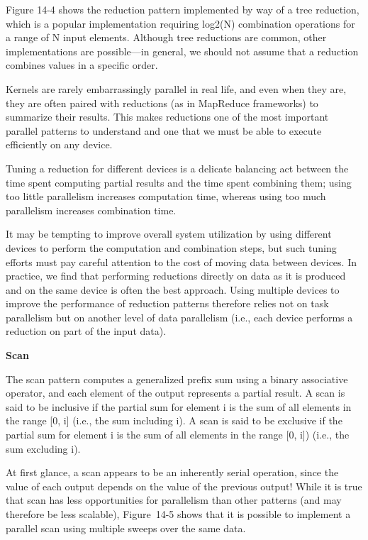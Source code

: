 Figure 14-4 shows the reduction pattern implemented by way of a tree reduction, which is a popular implementation requiring log2(N) combination operations for a range of N input elements. Although tree reductions are common, other implementations are possible—in general, we should not assume that a reduction combines values in a specific order.\par

Kernels are rarely embarrassingly parallel in real life, and even when they are, they are often paired with reductions (as in MapReduce frameworks) to summarize their results. This makes reductions one of the most important parallel patterns to understand and one that we must be able to execute efficiently on any device.\par

Tuning a reduction for different devices is a delicate balancing act between the time spent computing partial results and the time spent combining them; using too little parallelism increases computation time, whereas using too much parallelism increases combination time.\par

It may be tempting to improve overall system utilization by using different devices to perform the computation and combination steps, but such tuning efforts must pay careful attention to the cost of moving data between devices. In practice, we find that performing reductions directly on data as it is produced and on the same device is often the best approach. Using multiple devices to improve the performance of reduction patterns therefore relies not on task parallelism but on another level of data parallelism (i.e., each device performs a reduction on part of the input data).\par

\hspace*{\fill} \par %
\textbf{Scan}

The scan pattern computes a generalized prefix sum using a binary associative operator, and each element of the output represents a partial result. A scan is said to be inclusive if the partial sum for element i is the sum of all elements in the range [0, i] (i.e., the sum including i). A scan is said to be exclusive if the partial sum for element i is the sum of all elements in the range [0, i]) (i.e., the sum excluding i).\par

At first glance, a scan appears to be an inherently serial operation, since the value of each output depends on the value of the previous output! While it is true that scan has less opportunities for parallelism than other patterns (and may therefore be less scalable), Figure 14-5 shows that it is possible to implement a parallel scan using multiple sweeps over the same data.\par

